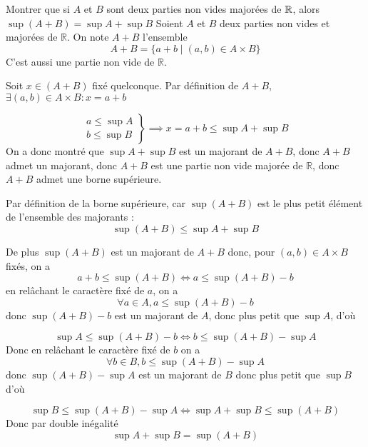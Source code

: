 \documentclass{article}
\begin{document}
\begin{question_kholle}[]{Montrer que si $A$ et $B$ sont deux parties non vides majorées de $\mathbb R$, alors $\sup(A+B) = \sup A + \sup B$}
  Soient $A$ et $B$ deux parties non vides et majorées de $\mathbb{R}$. On note $A+B$ l'ensemble
  $$
    A+B = \{ a+b \mid (a, b) \in A\times B \}
  $$
  C'est aussi une partie non vide de $\mathbb{R}$.

  Soit $x \in (A+B)$ fixé quelconque. Par définition de $A+B$, $\exists(a, b) \in A\times B : x=a+b$

  $$
    \left. \begin{array}{ll}
      a \leqslant \sup A \\
      b \leqslant \sup B
    \end{array}\right\} \implies x = a+b \leqslant \sup A + \sup B
  $$
  On a donc montré que $\sup A+\sup B$ est un majorant de $A+B$, donc $A+B$ admet un majorant, donc $A+B$ est une partie non vide majorée de $\mathbb{R}$, donc $A+B$ admet une borne supérieure.

  Par définition de la borne supérieure, car $\sup(A+B)$ est le plus petit élément de l'ensemble des majorants :
  $$\sup(A+B) \leqslant \sup A + \sup B$$

  De plus $\sup(A+B)$ est un majorant de $A+B$ donc, pour $(a, b) \in A\times B$ fixés, on a
  $$
    a+b \leqslant \sup (A+B) \iff a \leqslant \sup(A+B) -b
  $$
  en relâchant le caractère fixé de $a$, on a
  $$
    \forall a \in A, a\leqslant \sup(A+B) - b
  $$
  donc $\sup(A+B) - b$ est un majorant de $A$, donc plus petit que $\sup A$, d'où

  $$
    \sup A \leqslant \sup(A+B) - b \iff b \leqslant \sup(A+B) - \sup A
  $$
  Donc en relâchant le caractère fixé de $b$ on a
  $$
    \forall b \in B, b\leqslant \sup(A+B) - \sup A
  $$
  donc $\sup(A+B) - \sup A$ est un majorant de $B$ donc plus petit que $\sup B$
  d'où

  $$
    \sup B \leqslant \sup(A+B) - \sup A \iff \sup A + \sup B \leqslant \sup (A+B)
  $$
  Donc par double inégalité
  $$
    \sup A + \sup B = \sup (A+B)
  $$

\end{question_kholle}
\end{document}
